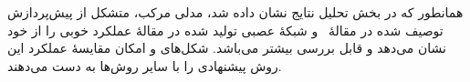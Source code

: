 همانطور که در بخش تحلیل نتایج نشان داده شد، مدلی مرکب، متشکل از پیش‌پردازش توصیف شده در مقالهٔ \آ\ و شبکهٔ عصبی تولید شده در مقالهٔ \پ عملکرد خوبی را از خود نشان می‌دهد و قابل بررسی بیشتر می‌باشد. شکل‌های  و  امکان مقایسهٔ عملکرد این روش پیشنهادی را با سایر روش‌ها به دست می‌دهند.

